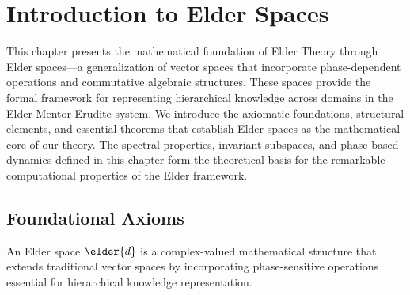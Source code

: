 \chapter{Introduction to Elder Spaces}

\begin{tcolorbox}[colback=DarkSkyBlue!5!white,colframe=DarkSkyBlue!75!black,title=Chapter Summary]
This chapter presents the mathematical foundation of Elder Theory through Elder spaces—a generalization of vector spaces that incorporate phase-dependent operations and commutative algebraic structures. These spaces provide the formal framework for representing hierarchical knowledge across domains in the Elder-Mentor-Erudite system. We introduce the axiomatic foundations, structural elements, and essential theorems that establish Elder spaces as the mathematical core of our theory. The spectral properties, invariant subspaces, and phase-based dynamics defined in this chapter form the theoretical basis for the remarkable computational properties of the Elder framework.
\end{tcolorbox}

\section{Foundational Axioms}

An Elder space $\elder{d}$ is a complex-valued mathematical structure that extends traditional vector spaces by incorporating phase-sensitive operations essential for hierarchical knowledge representation.

